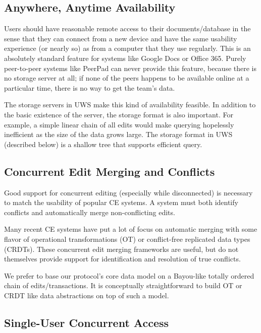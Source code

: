 \documentclass[runningheads]{llncs}
\begin{document}
\subsection{Anywhere, Anytime Availability}

Users should have reasonable remote access to their documents{\slash}database in the sense that they can connect from a new device and have the same usability experience (or nearly so) as from a computer that they use regularly.
This is an absolutely standard feature for systems like Google Docs or Office 365.
Purely peer-to-peer systems like PeerPad can never provide this feature, because there is no storage server at all; if none of the peers happens to be available online at a particular time, there is no way to get the team's data.

The storage servers in UWS make this kind of availability feasible.
In addition to the basic existence of the server, the storage format is also important.
For example, a simple linear chain of all edits would make querying hopelessly inefficient as the size of the data grows large.
The storage format in UWS (described below) is a shallow tree that supports efficient query.

\subsection{Concurrent Edit Merging and Conflicts}

Good support for concurrent editing (especially while disconnected) is necessary to match the usability of popular CE systems.
A system must both identify conflicts and automatically merge non-conflicting edits.

Many recent CE systems have put a lot of focus on automatic merging with some flavor of operational transformations (OT) or conflict-free replicated data types (CRDTs).
These concurrent edit merging frameworks are useful, but do not themselves provide support for identification and resolution of true conflicts.

We prefer to base our protocol's core data model on a Bayou-like totally ordered chain of edits{\slash}transactions.
It is conceptually straightforward to build OT or CRDT like data abstractions on top of such a model.

\subsection{Single-User Concurrent Access}
\end{document}
